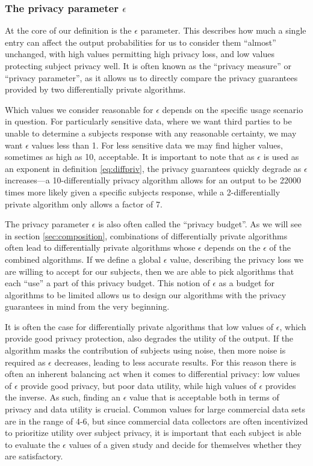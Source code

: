 \documentclass[12pt]{article}
\begin{document}
\subsubsection{The privacy parameter $\epsilon$ \label{sec:epsilon}}

At the core of our definition is the $\epsilon$ parameter. This describes how much a single entry can affect the output probabilities for us to consider them ``almost'' unchanged, with high values permitting high privacy loss, and low values protecting subject privacy well. It is often known as the ``privacy measure'' or ``privacy parameter'', as it allows us to directly compare the privacy guarantees provided by two differentially private algorithms.

Which values we consider reasonable for $\epsilon$ depends on the specific usage scenario in question. For particularly sensitive data, where we want third parties to be unable to determine a subjects response with any reasonable certainty, we may want $\epsilon$ values less than 1. For less sensitive data we may find higher values, sometimes as high as 10, acceptable. It is important to note that as $\epsilon$ is used as an exponent in definition \ref{eq:diffpriv}, the privacy guarantees quickly degrade as $\epsilon$ increases---a 10-differentially privacy algorithm allows for an output to be 22000 times more likely given a specific subjects response, while a 2-differentially private algorithm only allows a factor of 7.

The privacy parameter $\epsilon$ is also often called the ``privacy budget''. As we will see in section \ref{sec:composition}, combinations of differentially private algorithms often lead to differentially private algorithms whose $\epsilon$ depends on the $\epsilon$ of the combined algorithms. If we define a global $\epsilon$ value, describing the privacy loss we are willing to accept for our subjects, then we are able to pick algorithms that each ``use'' a part of this privacy budget. This notion of $\epsilon$ as a budget for algorithms to be limited allows us to design our algorithms with the privacy guarantees in mind from the very beginning.

It is often the case for differentially private algorithms that low values of $\epsilon$, which provide good privacy protection, also degrades the utility of the output. If the algorithm masks the contribution of subjects using noise, then more noise is required as $\epsilon$ decreases, leading to less accurate results. For this reason there is often an inherent balancing act when it comes to differential privacy: low values of $\epsilon$ provide good privacy, but poor data utility, while high values of $\epsilon$ provides the inverse. As such, finding an $\epsilon$ value that is acceptable both in terms of privacy and data utility is crucial. Common values for large commercial data sets \cite{apple_differential,us_census} are in the range of 4-6, but since commercial data collectors are often incentivized to prioritize utility over subject privacy, it is important that each subject is able to evaluate the $\epsilon$ values of a given study and decide for themselves whether they are satisfactory. \bigskip
\end{document}
